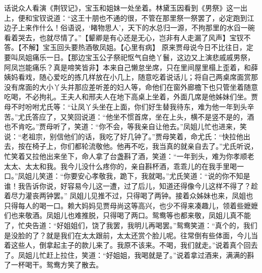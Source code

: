 \documentclass[12pt,oneside]{book}
\begin{document}
话说众人看演《荆钗记》，宝玉和姐妹一处坐着。林黛玉因看到《男祭》这一出上，便和宝钗说道：“这王十朋也不通的很，不管在那里祭一祭罢了，必定跑到江边子上来作什么！俗语说，‘睹物思人’，天下的水总归一源，不拘那里的水舀一碗看着哭去，也就尽情了。”【颦卿是有心还是无心，岂非有人走漏了风声】宝钗不答。【不解】宝玉回头要热酒敬凤姐。【心里有病】
原来贾母说今日不比往日，定要叫凤姐痛乐一日。【那边宝玉公子祭祀怄气自绝丫鬟，这边又上演悲戚戚男祭，阿凤岂能痛乐？真是啼笑皆非】本来自己懒怠坐席，只在里间屋里榻上歪着，和薛姨妈看戏，随心爱吃的拣几样放在小几上，随意吃着说话儿；将自己两桌席面赏那没有席面的大小丫头并那应差听差的妇人等，命他们在窗外廊檐下也只管坐着随意吃喝，不必拘礼。王夫人和邢夫人在地下高桌上坐着，外面几席是他姊妹们坐。贾母不时吩咐尤氏等：“让凤丫头坐在上面，你们好生替我待东，难为他一年到头辛苦。”尤氏答应了，又笑回说道：“他坐不惯首席，坐在上头，横不是竖不是的，酒也不肯吃。”贾母听了，笑道：“你不会，等我亲自让他去。”凤姐儿忙也进来，笑说：“老祖宗，别信他们的话，我吃了好几钟了。”贾母笑着，命尤氏：“快拉他出去，按在椅子上，你们都轮流敬他。他再不吃，我当真的就亲自去了。”尤氏听说，忙笑着又拉他出来坐下，命人拿了台盏斟了酒，笑道：“一年到头，难为你孝顺老太太、太太和我。我今儿没什么疼你的，亲自斟杯酒，乖乖儿的在我手里喝一口。”凤姐儿笑道：“你要安心孝敬我，跪下，我就喝。”尤氏笑道：“说的你不知是谁！我告诉你说，好容易今儿这一遭，过了后儿，知道还得像今儿这样不得了？趁着尽力灌丧两钟罢。”
凤姐儿见推不过，只得喝了两钟。接着众姊妹也来，凤姐也只得每人的喝一口。赖大妈妈见贾母尚这等高兴，也少不得来凑趣儿，领着些嬷嬷们也来敬酒。凤姐儿也难推脱，只得喝了两口。鸳鸯等也都来敬，凤姐儿真不能了，忙央告道：“好姐姐们，饶了我罢，我明儿再喝罢。”鸳鸯笑道：“真个的，我们是没脸的了？就是我们在太太跟前，太太还赏个脸儿呢。往常倒有些体面，今儿当着这些人，倒拿起主子的款儿来了。我原不该来。不喝，我们就走。”说着真个回去了。凤姐儿忙赶上拉住，笑道：“好姐姐，我喝就是了。”说着拿过酒来，满满的斟了一杯喝干。鸳鸯方笑了散去。
\end{document}
